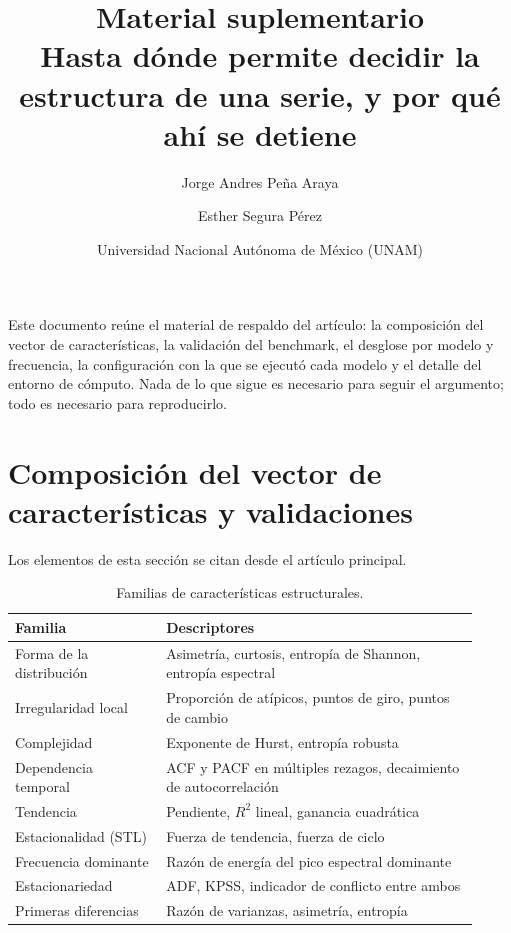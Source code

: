 \title{Material suplementario\\
       \large Hasta dónde permite decidir la estructura de una serie,
       y por qué ahí se detiene}
\author{Jorge Andres Pe\~na Araya \and Esther Segura P\'erez}
\date{Universidad Nacional Aut\'onoma de M\'exico (UNAM)}
\decimalpoint
\maketitle

\renewcommand{\thetable}{S\arabic{table}}
\renewcommand{\thefigure}{S\arabic{figure}}
\renewcommand{\thesection}{S\arabic{section}}
\setcounter{section}{0}

\noindent
Este documento reúne el material de respaldo del artículo: la composición del vector de
características, la validación del benchmark, el desglose por modelo y frecuencia, la
configuración con la que se ejecutó cada modelo y el detalle del entorno de cómputo.
Nada de lo que sigue es necesario para seguir el argumento; todo es necesario para
reproducirlo.

\section{Composición del vector de características y validaciones}

Los elementos de esta sección se citan desde el artículo principal.

\begin{table}[htbp]
\centering
\caption{Familias de características estructurales.}
\label{tab:familias}
\begin{tabular}{p{0.30\linewidth}p{0.62\linewidth}}
\toprule
\textbf{Familia} & \textbf{Descriptores} \\
\midrule
Forma de la distribución & Asimetría, curtosis, entropía de Shannon, entropía espectral \\
Irregularidad local      & Proporción de atípicos, puntos de giro, puntos de cambio \\
Complejidad              & Exponente de Hurst, entropía robusta \\
Dependencia temporal     & ACF y PACF en múltiples rezagos, decaimiento de autocorrelación \\
Tendencia                & Pendiente, $R^{2}$ lineal, ganancia cuadrática \\
Estacionalidad (STL)     & Fuerza de tendencia, fuerza de ciclo \\
Frecuencia dominante     & Razón de energía del pico espectral dominante \\
Estacionariedad          & ADF, KPSS, indicador de conflicto entre ambos \\
Primeras diferencias     & Razón de varianzas, asimetría, entropía \\
\bottomrule
\end{tabular}
\end{table}

